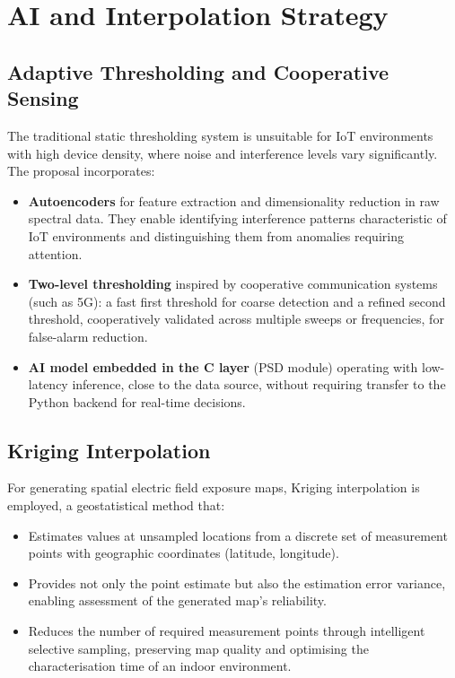 \documentclass[12pt,a4paper]{article}
\begin{document}
\section{AI and Interpolation Strategy}

\subsection{Adaptive Thresholding and Cooperative Sensing}

The traditional static thresholding system is unsuitable for IoT environments with high device density, where noise and interference levels vary significantly. The proposal incorporates:

\begin{itemize}
  \item \textbf{Autoencoders} for feature extraction and dimensionality reduction in raw spectral data. They enable identifying interference patterns characteristic of IoT environments and distinguishing them from anomalies requiring attention.
  \item \textbf{Two-level thresholding} inspired by cooperative communication systems (such as 5G): a fast first threshold for coarse detection and a refined second threshold, cooperatively validated across multiple sweeps or frequencies, for false-alarm reduction.
  \item \textbf{AI model embedded in the C layer} (PSD module) operating with low-latency inference, close to the data source, without requiring transfer to the Python backend for real-time decisions.
\end{itemize}

\subsection{Kriging Interpolation}

For generating spatial electric field exposure maps, Kriging interpolation is employed, a geostatistical method that:

\begin{itemize}
  \item Estimates values at unsampled locations from a discrete set of measurement points with geographic coordinates (latitude, longitude).
  \item Provides not only the point estimate but also the estimation error variance, enabling assessment of the generated map's reliability.
  \item Reduces the number of required measurement points through intelligent selective sampling, preserving map quality and optimising the characterisation time of an indoor environment.
\end{itemize}
\end{document}
